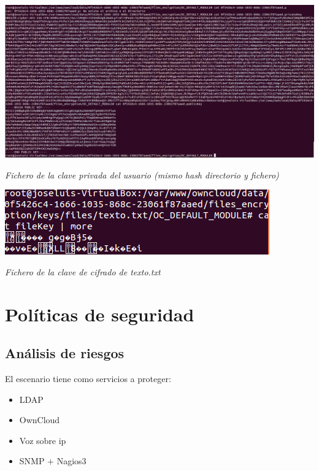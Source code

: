 \documentclass[]{article}
\begin{document}
\begin{center}
	\includegraphics[scale=0.33]{images/owncloud/2.png}
	
	\textit{Fichero de la clave privada del usuario (mismo hash directorio y fichero)}
\end{center}


\begin{center}
	\includegraphics[scale=0.65]{images/owncloud/3.png}
	
	\textit{Fichero de la clave de cifrado de texto.txt}
\end{center}





\section{Políticas de seguridad}

\subsection{Análisis de riesgos}
El escenario tiene como servicios a proteger:

\begin{itemize}
	\item LDAP
	\item OwnCloud
	\item Voz sobre ip
	\item SNMP + Nagios3
\end{itemize}
\end{document}
